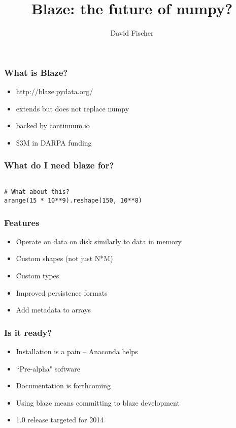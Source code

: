 \documentclass{beamer}
\title[San Diego Python]{Blaze: the future of numpy?}
\author{David Fischer}
\begin{document}
\begin{frame}
\titlepage
\end{frame}

\begin{frame}
\frametitle{What is Blaze?}
\begin{itemize}
\item http://blaze.pydata.org/
\item extends but does not replace numpy
\item backed by continuum.io
\item \$3M in DARPA funding
\end{itemize}
\end{frame}


\begin{frame}[fragile] %
\frametitle{What do I need blaze for?}
\begin{verbatim}

# What about this?
arange(15 * 10**9).reshape(150, 10**8)

\end{verbatim} 
\end{frame}


\begin{frame}
\frametitle{Features}
\begin{itemize}
\item Operate on data on disk similarly to data in memory
\item Custom shapes (not just N*M)
\item Custom types
\item Improved persistence formats   %
\item Add metadata to arrays
\end{itemize}
\end{frame}
 
 
\begin{frame}
\frametitle{Is it ready?}
\begin{itemize}
\item Installation is a pain -- Anaconda helps
\item ``Pre-alpha" software
\item Documentation is forthcoming
\item Using blaze means committing to blaze development   %
\item 1.0 release targeted for 2014
\end{itemize}
\end{frame}
\end{document}
